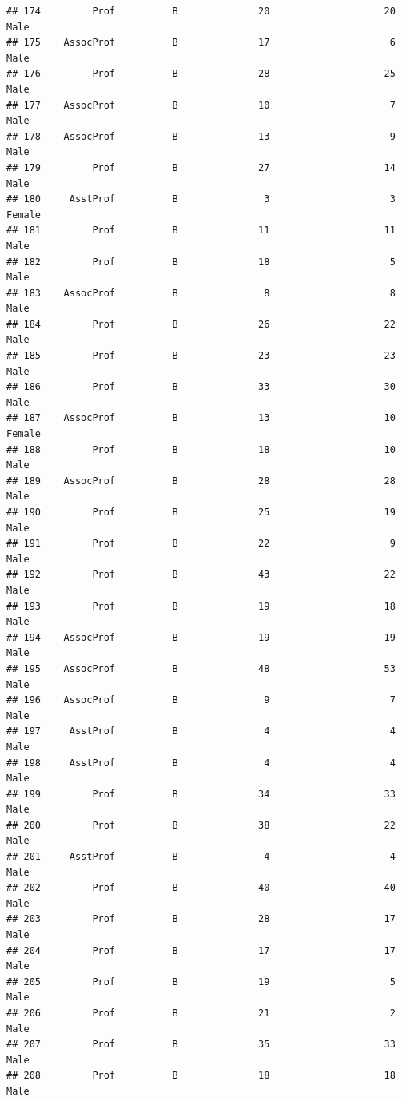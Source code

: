 \documentclass[]{article}
\begin{document}
\begin{verbatim}
## 174         Prof          B              20                    20   Male
## 175    AssocProf          B              17                     6   Male
## 176         Prof          B              28                    25   Male
## 177    AssocProf          B              10                     7   Male
## 178    AssocProf          B              13                     9   Male
## 179         Prof          B              27                    14   Male
## 180     AsstProf          B               3                     3 Female
## 181         Prof          B              11                    11   Male
## 182         Prof          B              18                     5   Male
## 183    AssocProf          B               8                     8   Male
## 184         Prof          B              26                    22   Male
## 185         Prof          B              23                    23   Male
## 186         Prof          B              33                    30   Male
## 187    AssocProf          B              13                    10 Female
## 188         Prof          B              18                    10   Male
## 189    AssocProf          B              28                    28   Male
## 190         Prof          B              25                    19   Male
## 191         Prof          B              22                     9   Male
## 192         Prof          B              43                    22   Male
## 193         Prof          B              19                    18   Male
## 194    AssocProf          B              19                    19   Male
## 195    AssocProf          B              48                    53   Male
## 196    AssocProf          B               9                     7   Male
## 197     AsstProf          B               4                     4   Male
## 198     AsstProf          B               4                     4   Male
## 199         Prof          B              34                    33   Male
## 200         Prof          B              38                    22   Male
## 201     AsstProf          B               4                     4   Male
## 202         Prof          B              40                    40   Male
## 203         Prof          B              28                    17   Male
## 204         Prof          B              17                    17   Male
## 205         Prof          B              19                     5   Male
## 206         Prof          B              21                     2   Male
## 207         Prof          B              35                    33   Male
## 208         Prof          B              18                    18   Male

\end{verbatim}
\end{document}
